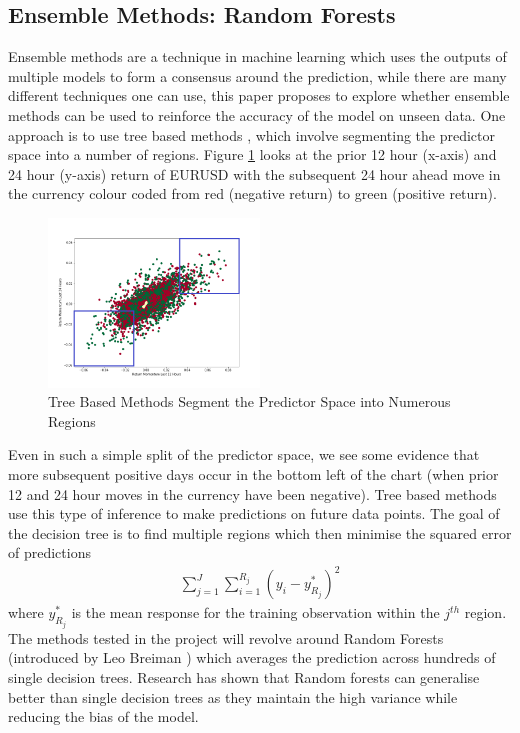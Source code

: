 \documentclass[12pt, a4paper]{article}
\begin{document}
\subsection{Ensemble Methods: Random Forests}
Ensemble methods are a technique in machine learning which uses the outputs of multiple models to form a consensus around the prediction, while there are many different techniques one can use, this paper proposes to explore whether ensemble methods can be used to reinforce the accuracy of the model on unseen data. One approach is to use tree based methods \cite{Podgorelec2015} , which involve segmenting the predictor space into a number of regions.  Figure \ref{fig:EURUSDMomentum} looks at the prior 12 hour (x-axis) and 24 hour (y-axis) return of EURUSD with the subsequent 24 hour ahead move in the currency colour coded from red (negative return) to green (positive return). 
\begin{figure}[h]
    \centering
    \includegraphics[width=0.5\textwidth]{EURUSDMomentum}
    \caption{Tree Based Methods Segment the Predictor Space into Numerous Regions}
    \label{fig:EURUSDMomentum}
\end{figure}
Even in such a simple split of the predictor space, we see some evidence that more subsequent positive days occur in the bottom left of the chart (when prior 12 and 24 hour moves in the currency have been negative). Tree based methods use this type of inference to make predictions on future data points. The goal of the decision tree is to find multiple regions which then minimise the squared error of predictions
\begin{align}
\sum^{J}_{j = 1}\sum^{R_{j}}_{i = 1} (y_{i}-y^{*}_{R_{j}})^{2} 
\end{align}
 where $y^{*}_{R_{j}}$ is the mean response for the training observation within the $j^{th}$ region.
The methods tested in the project will revolve around Random Forests (introduced by Leo Breiman \cite{Breiman2001}) which averages the prediction across hundreds of single decision trees. Research has shown that Random forests can generalise better than single decision trees as they maintain the high variance while reducing the bias of the model\cite{Genuer2012}.
\end{document}
